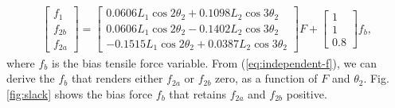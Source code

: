 \documentclass{llncs}
\begin{document}
\begin{align}
	\begin{bmatrix}
		f_1		\\
		f_{2b}	\\
		f_{2a}
	\end{bmatrix} = \begin{bmatrix}
		0.0606L_1\cos2\theta_2+0.1098L_2\cos3\theta_2	\\
		0.0606L_1\cos2\theta_2-0.1402L_2\cos3\theta_2	\\
		-0.1515L_1\cos2\theta_2+0.0387L_2\cos3\theta_2
	\end{bmatrix}F
	+\begin{bmatrix}
		1 \\
		1 \\
		0.8
	\end{bmatrix}f_b,\label{eq:independent-f}
\end{align}
where $f_b$ is the bias tensile force variable.
From (\ref{eq:independent-f}), we can derive the $f_b$ that renders either $f_{2a}$ or $f_{2b}$ zero, as a function of $F$ and $\theta_2$.
Fig. \ref{fig:slack} shows the bias force $f_b$ that retains $f_{2a}$ and $f_{2b}$ positive.
\end{document}
